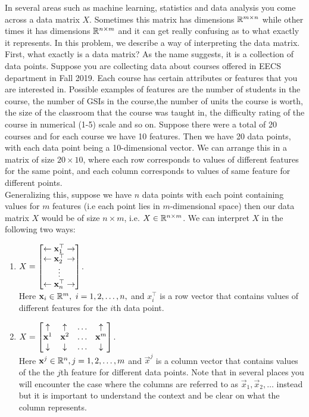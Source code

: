 
In several areas such as machine learning, statistics and data analysis you come across a data matrix $X$. Sometimes this matrix has dimensions $\mathbb{R}^{m \times n}$ while other times it has dimensions $\mathbb{R}^{n \times m}$ and it can get really confusing as to what exactly it represents. In this problem, we describe a way of interpreting the data matrix. \\

First, what exactly is a data matrix? As the name suggests, it is a collection of data points. Suppose you are collecting data about courses offered in EECS department in Fall 2019. Each course has certain attributes or features that you are interested in. Possible examples of features are the number of students in the course, the number of GSIs in the course,the  number of units the course is worth, the size of the classroom that the course was taught in, the difficulty rating of the course in numerical (1-5) scale and so on. Suppose there were a total of 20 courses and for each course we have 10 features. Then we have 20 data points, with each data point being a 10-dimensional vector. We can arrange this in a matrix of size $20 \times 10$, where each row corresponds to values of different features for the same point, and each column corresponds to values of same feature for different points. \\

Generalizing this, suppose we have $n$ data points with each point containing values for $m$ features (i.e each point lies in $m$-dimensional space) then our data matrix $X$ would be of size $n \times m$, i.e. $X \in \mathbb{R}^{n \times m}$. We can interpret $X$ in the following two ways:
\begin{enumerate}
    \item $X = \begin{bmatrix}\leftarrow \mathbf{x}_1^\top \rightarrow \\  \leftarrow \mathbf{x}_2^\top  \rightarrow \\ \vdots \\ \leftarrow \mathbf{x}_n^\top \rightarrow\end{bmatrix}$. \\
    Here $\mathbf{x}_i \in \mathbb{R}^{m},\ i = 1, 2, \hdots, n,$ and $x_i^\top$ is a row vector that contains values of different features for the $i$th  data point. 
    \item $X = \begin{bmatrix}\uparrow & \uparrow & \hdots & \uparrow\\ \mathbf{x}^1 & \mathbf{x}^2 & \hdots & \mathbf{x}^m \\  \downarrow & \downarrow & \hdots & \downarrow\end{bmatrix}$.\\
    Here $\mathbf{x}^j \in \mathbb{R}^{n}, j = 1,2,\hdots,m$ and $\vec{x}^j$ is a column vector that contains values of the the $j$th feature for different data points. Note that in several places you will encounter the case where the columns are referred to as $\vec{x}_1, \vec{x}_2, \dots$ instead but it is important to understand the context and be clear on what the column represents.
\end{enumerate}

